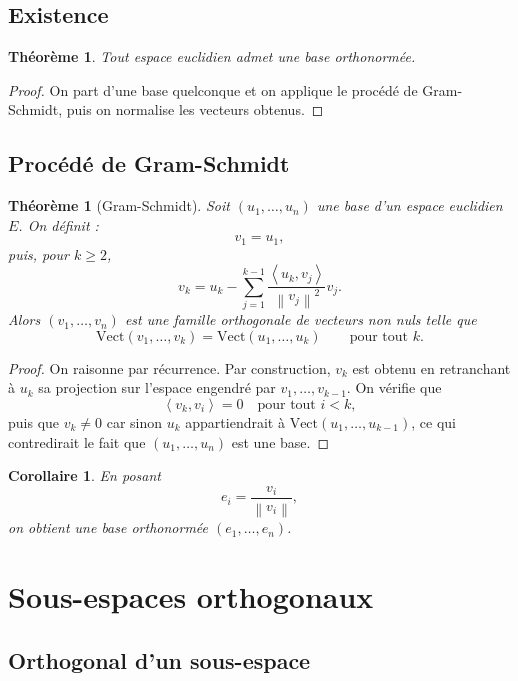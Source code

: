 \documentclass[11pt,a4paper]{article}
\newtheorem{theoreme}[definition]{Théorème}
\newtheorem{corollaire}[definition]{Corollaire}
\theoremstyle{remark}
\newcommand{\Vect}{\mathrm{Vect}}
\newcommand{\Norm}[1]{\left\|#1\right\|}
\newcommand{\scal}[2]{\left\langle #1,#2\right\rangle}
\begin{document}
\subsection{Existence}

\begin{theoreme}
Tout espace euclidien admet une base orthonormée.
\end{theoreme}

\begin{proof}
On part d’une base quelconque et on applique le procédé de Gram-Schmidt, puis on normalise les vecteurs obtenus.
\end{proof}

\subsection{Procédé de Gram-Schmidt}

\begin{theoreme}[Gram-Schmidt]
Soit \((u_1,\dots,u_n)\) une base d’un espace euclidien \(E\). On définit :
\[
v_1=u_1,
\]
puis, pour \(k\ge 2\),
\[
v_k=u_k-\sum_{j=1}^{k-1}\frac{\scal{u_k}{v_j}}{\Norm{v_j}^2}v_j.
\]
Alors \((v_1,\dots,v_n)\) est une famille orthogonale de vecteurs non nuls telle que
\[
\Vect(v_1,\dots,v_k)=\Vect(u_1,\dots,u_k)
\qquad \text{pour tout } k.
\]
\end{theoreme}

\begin{proof}
On raisonne par récurrence. Par construction, \(v_k\) est obtenu en retranchant à \(u_k\) sa projection sur l’espace engendré par \(v_1,\dots,v_{k-1}\). On vérifie que
\[
\scal{v_k}{v_i}=0
\quad \text{pour tout } i<k,
\]
puis que \(v_k\neq 0\) car sinon \(u_k\) appartiendrait à \(\Vect(u_1,\dots,u_{k-1})\), ce qui contredirait le fait que \((u_1,\dots,u_n)\) est une base.
\end{proof}

\begin{corollaire}
En posant
\[
e_i=\frac{v_i}{\Norm{v_i}},
\]
on obtient une base orthonormée \((e_1,\dots,e_n)\).
\end{corollaire}

\section{Sous-espaces orthogonaux}

\subsection{Orthogonal d’un sous-espace}
\end{document}
